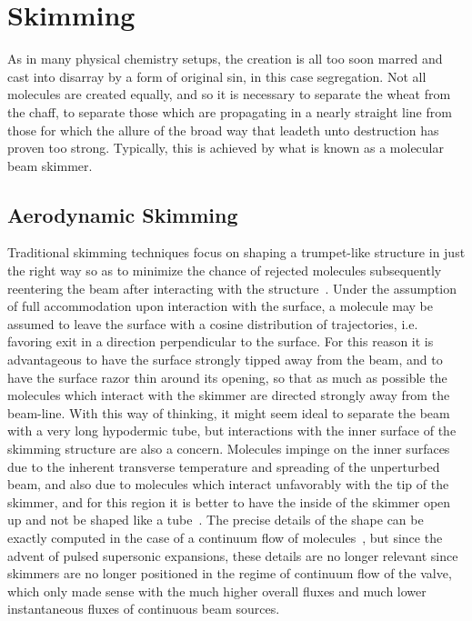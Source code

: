 \ifx\justbeingincluded\undefined


\fi



\chapter{Skimming}
\label{chapter:skimming}

As in many physical chemistry setups, the creation is all too soon marred and cast into disarray by a form of original sin, in this case segregation. Not all molecules are created equally, and so it is necessary to separate the wheat from the chaff, to separate those which are propagating in a nearly straight line from those for which the allure of the broad way that leadeth unto destruction has proven too strong. Typically, this is achieved by what is known as a molecular beam skimmer.

\section{Aerodynamic Skimming}

Traditional skimming techniques focus on shaping a trumpet-like structure in just the right way so as to minimize the chance of rejected molecules subsequently reentering the beam after interacting with the structure~\cite{Bossel1971,Bossel1974}.
Under the assumption of full accommodation upon interaction with the surface, a molecule may be assumed to leave the surface with a cosine distribution of trajectories, i.e. favoring exit in a direction perpendicular to the surface.
For this reason it is advantageous to have the surface strongly tipped away from the beam, and to have the surface razor thin around its opening, so that as much as possible the molecules which interact with the skimmer are directed strongly away from the beam-line.
With this way of thinking, it might seem ideal to separate the beam with a very long hypodermic tube, but interactions with the inner surface of the skimming structure are also a concern.
Molecules impinge on the inner surfaces due to the inherent transverse temperature and spreading of the unperturbed beam, and also due to molecules which interact unfavorably with the tip of the skimmer, and for this region it is better to have the inside of the skimmer open up and not be shaped like a tube~\citep[Sec.~2.4]{Bossel1971}.
The precise details of the shape can be exactly computed in the case of a continuum flow of molecules~\cite{Campargue1984}, but since the advent of pulsed supersonic expansions, these details are no longer relevant since skimmers are no longer positioned in the regime of continuum flow of the valve, which only made sense with the much higher overall fluxes and much lower instantaneous fluxes of continuous beam sources.

